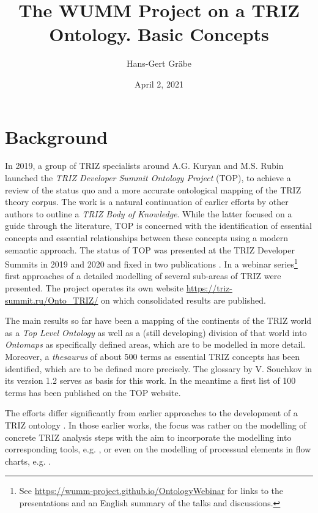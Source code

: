 \documentclass[11pt,a4paper]{article}
\title{The WUMM Project on a TRIZ Ontology. Basic Concepts}
\author{Hans-Gert Gr\"abe}
\date{April 2,  2021}
\begin{document}
\maketitle

\section{Background}

In 2019, a group of TRIZ specialists around A.G. Kuryan and M.S. Rubin
launched the \emph{TRIZ Developer Summit Ontology Project} (TOP), to achieve a
review of the status quo and a more accurate ontological mapping of the TRIZ
theory corpus. The work is a natural continuation of earlier efforts by other
authors \cite{TBK2007, TBK2012} to outline a \emph{TRIZ Body of Knowledge}.
While the latter focused on a guide through the literature, TOP is concerned
with the identification of essential concepts and essential relationships
between these concepts using a modern semantic approach. The status of TOP was
presented at the TRIZ Developer Summits in 2019 and 2020 and fixed in two
publications \cite{TOP2019, TOP2020}. In a webinar series\footnote{See
  \url{https://wumm-project.github.io/OntologyWebinar} for links to the
  presentations and an English summary of the talks and discussions.}  first
approaches of a detailed modelling of several sub-areas of TRIZ were
presented.  The project operates its own website
\url{https://triz-summit.ru/Onto_TRIZ/} on which consolidated results are
published.

The main results so far have been a mapping of the continents of the TRIZ
world as a \emph{Top Level Ontology} as well as a (still developing) division
of that world into \emph{Ontomaps} as specifically defined areas, which are to
be modelled in more detail. Moreover, a \emph{thesaurus} of about 500 terms as
essential TRIZ concepts has been identified, which are to be defined more
precisely. The glossary \cite{Souchkov2018} by V. Souchkov in its version 1.2
serves as basis for this work. In the meantime a first list of 100 terms
\cite{TOP-Glossary} has been published on the TOP website.

The efforts differ significantly from earlier approaches to the development of
a TRIZ ontology \cite{Bultey2007, Bultey2015, Cavallucci2011, Dubois2007,
  Zanni2009, Zanni2013}. In those earlier works, the focus was rather on the
modelling of concrete TRIZ analysis steps with the aim to incorporate the
modelling into corresponding tools, e.g. \cite{Cavallucci2011}, or even on the
modelling of processual elements in flow charts, e.g. \cite{Bultey2015}.
\end{document}
